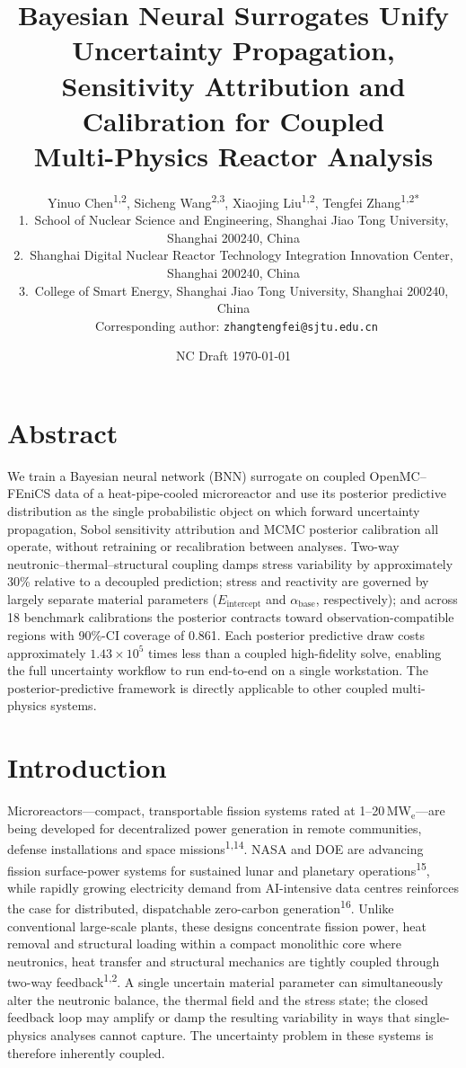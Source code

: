 \documentclass[11pt,a4paper]{article}
\title{\textbf{Bayesian Neural Surrogates Unify Uncertainty Propagation,\\
Sensitivity Attribution and Calibration for Coupled\\
Multi-Physics Reactor Analysis}}
\author{Yinuo Chen\textsuperscript{1,2},
Sicheng Wang\textsuperscript{2,3},
Xiaojing Liu\textsuperscript{1,2},
Tengfei Zhang\textsuperscript{1,2*}\\[0.5em]
\small 1.~School of Nuclear Science and Engineering, Shanghai Jiao Tong University,
Shanghai 200240, China\\
\small 2.~Shanghai Digital Nuclear Reactor Technology Integration Innovation Center,
Shanghai 200240, China\\
\small 3.~College of Smart Energy, Shanghai Jiao Tong University,
Shanghai 200240, China\\[0.3em]
\small *~Corresponding author: \texttt{zhangtengfei@sjtu.edu.cn}}
\date{NC Draft \textperiodcentered{} \today}
\newcommand{\Eint}{\ensuremath{E_{\mathrm{intercept}}}}
\newcommand{\abase}{\ensuremath{\alpha_{\mathrm{base}}}}
\begin{document}
\maketitle

\section*{Abstract}

We train a Bayesian neural network (BNN) surrogate on coupled
OpenMC--FEniCS data of a heat-pipe-cooled microreactor and use its
posterior predictive distribution as the single probabilistic object on
which forward uncertainty propagation, Sobol sensitivity attribution and
MCMC posterior calibration all operate, without retraining or
recalibration between analyses. Two-way neutronic--thermal--structural
coupling damps stress variability by approximately 30\% relative to a
decoupled prediction; stress and reactivity are governed by largely
separate material parameters (\Eint{} and \abase{}, respectively); and
across 18 benchmark calibrations the posterior contracts toward
observation-compatible regions with 90\%-CI coverage of 0.861. Each
posterior predictive draw costs approximately $1.43\times 10^{5}$ times
less than a coupled high-fidelity solve, enabling the full uncertainty
workflow to run end-to-end on a single workstation. The
posterior-predictive framework is directly applicable to other coupled
multi-physics systems.

\section{Introduction}

Microreactors---compact, transportable fission systems rated at
1--20\,MW$_\mathrm{e}$---are being developed for decentralized power
generation in remote communities, defense installations and space
missions\textsuperscript{1,14}. NASA and DOE are advancing fission
surface-power systems for sustained lunar and planetary
operations\textsuperscript{15}, while rapidly growing electricity demand
from AI-intensive data centres reinforces the case for distributed,
dispatchable zero-carbon generation\textsuperscript{16}. Unlike
conventional large-scale plants, these designs concentrate fission power,
heat removal and structural loading within a compact monolithic core
where neutronics, heat transfer and structural mechanics are tightly
coupled through two-way feedback\textsuperscript{1,2}. A single
uncertain material parameter can simultaneously alter the neutronic
balance, the thermal field and the stress state; the closed feedback
loop may amplify or damp the resulting variability in ways that
single-physics analyses cannot capture. The uncertainty problem in these
systems is therefore inherently coupled.
\end{document}
